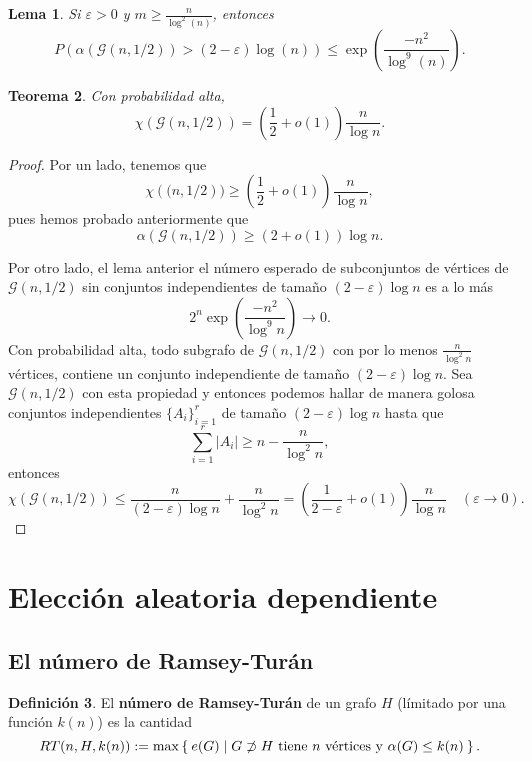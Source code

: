 \documentclass[12pt]{report}
\theoremstyle{plain}
\newtheorem{theorem}{Teorema}[section]
\newtheorem{lemma}[theorem]{Lema}
\theoremstyle{definition}
\newtheorem{definition}[theorem]{Definición}
\newcommand{\abs}[1]{\left \vert #1 \right \vert}
\begin{document}
\begin{lemma}
Si $\varepsilon > 0$ y $m \geq \frac{n}{\log ^2 (n)}$, entonces
\[
    P (\alpha (\mathcal G (n, 1/2)) > (2 - \varepsilon) \log (n)) \leq \exp ( \frac{-n^2}{\log^9 (n)}).
\]
\end{lemma}

\begin{theorem}
Con probabilidad alta,
\[
    \chi (\mathcal G (n, 1/2)) = (\frac 1 2 + o(1)) \frac{n}{\log n}.
\]
\end{theorem}

\begin{proof}
Por un lado, tenemos que
\[
\chi (\mathcal (n, 1/2)) \geq (\frac 1 2 + o(1))
\frac{n}{\log n},
\]
pues hemos probado anteriormente que
\[
\alpha (\mathcal G (n, 1/2)) \geq (2 + o(1)) \log n.
\]

Por otro lado, el lema anterior el número esperado de subconjuntos de vértices de $\mathcal G (n, 1/2)$ sin conjuntos independientes de tamaño $(2- \varepsilon) \log n$ es a lo más
\[
2^n \exp (\frac{- n^2}{\log^9 n}) \longrightarrow 0.
\]
Con probabilidad alta, todo subgrafo de $\mathcal G (n, 1/2)$ con por lo menos $\frac{n}{\log^2 n}$ vértices, contiene un conjunto independiente de tamaño $(2-\varepsilon) \log n$. Sea $\mathcal G (n, 1/2)$ con esta propiedad y entonces podemos hallar de manera golosa conjuntos independientes $\{A_i\}_{i = 1}^r$ de tamaño $(2-\varepsilon) \log n$ hasta que
\[
    \sum_{i = 1}^r \abs{A_i} \geq n - \frac{n}{\log^2 n},
\]
entonces
\[
    \chi (\mathcal G (n, 1/2)) \leq \frac{n}{(2-\varepsilon) \log n} + \frac{n}{\log ^2 n} = (\frac{1}{2 - \varepsilon} + o(1)) \frac{n}{\log n} \quad ( \varepsilon \to 0).
\]
\end{proof}













\section{Elección aleatoria dependiente}

\subsection{El número de Ramsey-Turán}

\begin{definition}
El \textbf{número de Ramsey-Turán} de un grafo $H$ (límitado por una función $k(n)$) es la cantidad
\[
RT (n, H, k(n)) := \max \Set{e(G) | G \not \supset H \text{ tiene $n$ vértices y } \alpha (G) \leq k(n)}.
\]
\end{definition}
\end{document}
